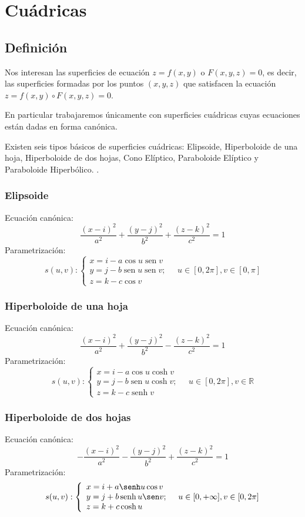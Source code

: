 \chapter{Cuádricas}
\section{Definición}
Nos interesan las superficies de ecuación $z=f(x, y)$ o $F(x, y, z)=0$, es decir, las superficies formadas por los puntos $(x, y, z)$ que satisfacen la ecuación $z=f(x, y) \circ F(x, y, z)=0$.

En particular trabajaremos únicamente con superficies cuádricas cuyas ecuaciones están dadas en forma canónica.

Existen seis tipos básicos de superficies cuádricas: Elipsoide, Hiperboloide de una hoja, Hiperboloide de dos hojas, Cono Elíptico, Paraboloide Elíptico y Paraboloide Hiperbólico. \cite{solis2016graficas}.
\subsection{Elipsoide}
Ecuación canónica:
$$
    \frac{(x-i)^{2}}{a^{2}}+\frac{(y-j)^{2}}{b^{2}}+\frac{(z-k)^{2}}{c^{2}}=1
$$
Parametrización:
$$
    s(u, v):\left\{\begin{array}{l}
        x=i-a \cos u \operatorname{sen} v                 \\
        y=j-b \operatorname{sen} u \operatorname{sen} v ; \\
        z=k-c \cos v
    \end{array} \quad u \in[0,2 \pi], v \in[0, \pi]\right.
$$

\subsection{Hiperboloide de una hoja}
Ecuación canónica:
$$
    \frac{(x-i)^{2}}{a^{2}}+\frac{(y-j)^{2}}{b^{2}}-\frac{(z-k)^{2}}{c^{2}}=1
$$
Parametrización:
$$
    s(u, v):\left\{\begin{array}{l}
        x=i-a \cos u \cosh v                 \\
        y=j-b \operatorname{sen} u \cosh v ; \\
        z=k-c \operatorname{senh} v
    \end{array} \quad u \in[0,2 \pi], v \in \mathbb{R}\right.
$$

\subsection{Hiperboloide de dos hojas}
Ecuación canónica:
$$
    -\frac{(x-i)^{2}}{a^{2}}-\frac{(y-j)^{2}}{b^{2}}+\frac{(z-k)^{2}}{c^{2}}=1
$$
Parametrización:
$$
    s(u, v):\left\{\begin{array}{l}
        x=i+a \senh u \cos v                 \\
        y=j+b \operatorname{senh} u \sen v ; \\
        z=k+c \operatorname{cosh} u
    \end{array} \quad u \in[0, + \infty], v  \in[0,2 \pi] \right.
$$

